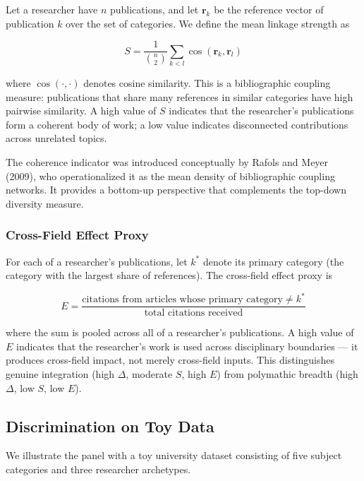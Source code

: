 \documentclass[
]{article}
\begin{document}
Let a researcher have \(n\) publications, and let \(\mathbf{r}_k\) be
the reference vector of publication \(k\) over the set of categories. We
define the mean linkage strength as

\[S = \frac{1}{\binom{n}{2}} \sum_{k < l} \cos(\mathbf{r}_k, \mathbf{r}_l)\]

where \(\cos(\cdot, \cdot)\) denotes cosine similarity. This is a
bibliographic coupling measure: publications that share many references
in similar categories have high pairwise similarity. A high value of
\(S\) indicates that the researcher's publications form a coherent body
of work; a low value indicates disconnected contributions across
unrelated topics.

The coherence indicator was introduced conceptually by Rafols and Meyer
(2009), who operationalized it as the mean density of bibliographic
coupling networks. It provides a bottom-up perspective that complements
the top-down diversity measure.

\hypertarget{cross-field-effect-proxy}{%
\subsubsection{Cross-Field Effect
Proxy}\label{cross-field-effect-proxy}}

For each of a researcher's publications, let \(k^*\) denote its primary
category (the category with the largest share of references). The
cross-field effect proxy is

\[E = \frac{\text{citations from articles whose primary category} \neq k^*}{\text{total citations received}}\]

where the sum is pooled across all of a researcher's publications. A
high value of \(E\) indicates that the researcher's work is used across
disciplinary boundaries --- it produces cross-field impact, not merely
cross-field inputs. This distinguishes genuine integration (high
\(\Delta\), moderate \(S\), high \(E\)) from polymathic breadth (high
\(\Delta\), low \(S\), low \(E\)).

\hypertarget{discrimination-on-toy-data}{%
\subsection{Discrimination on Toy
Data}\label{discrimination-on-toy-data}}

We illustrate the panel with a toy university dataset consisting of five
subject categories and three researcher archetypes.
\end{document}
